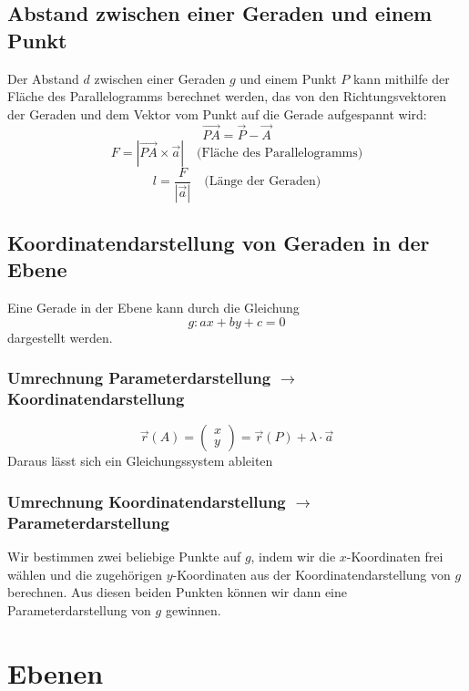 \documentclass{article}
\begin{document}
\begin{minipage}[t]{0.45\textwidth}
    \subsection*{Abstand zwischen einer Geraden und einem Punkt}
    Der Abstand \( d \) zwischen einer Geraden \( g \) und einem Punkt \( P \) kann mithilfe der Fläche des Parallelogramms berechnet werden, 
    das von den Richtungsvektoren der Geraden und dem Vektor vom Punkt auf die Gerade aufgespannt wird:
    \begin{equation*}
        \overrightarrow{PA} = \vec{P} - \vec{A}
    \end{equation*}
    \begin{equation*}
        F = |\overrightarrow{PA} \times \vec{a}|
        \quad \text{(Fläche des Parallelogramms)}
    \end{equation*}
    \begin{equation*}
        l = \frac{F}{|\vec{a}|}
        \quad \text{(Länge der Geraden)}
    \end{equation*}
\end{minipage}

\begin{minipage}[t]{0.45\textwidth}
    \subsection*{Koordinatendarstellung von Geraden in der Ebene}
    Eine Gerade in der Ebene kann durch die Gleichung
    \begin{equation*}
        g: ax + by + c = 0
    \end{equation*}
    dargestellt werden.
    \subsubsection*{Umrechnung Parameterdarstellung $\to$ Koordinatendarstellung}
    \begin{equation*}
        \vec{r}(A) = \begin{pmatrix}
        x \\
        y
        \end{pmatrix} = \vec{r}(P) + \lambda \cdot \vec{a}
    \end{equation*}
    Daraus lässt sich ein Gleichungssystem ableiten
\end{minipage}
\hfill
\begin{minipage}[t]{0.45\textwidth}
    \subsubsection*{Umrechnung Koordinatendarstellung $\to$ Parameterdarstellung}
    Wir bestimmen zwei beliebige Punkte auf $g$, indem wir die $x$-Koordinaten frei wählen und die
zugehörigen $y$-Koordinaten aus der Koordinatendarstellung von $g$ berechnen. Aus diesen beiden
Punkten können wir dann eine Parameterdarstellung von $g$ gewinnen.
\end{minipage}

\section*{Ebenen}
\end{document}
